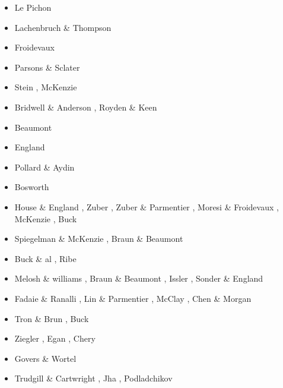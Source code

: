 \begin{scriptsize}
\begin{itemize}
\item[\nineteensixtyeight] Le Pichon \cite{lepi68}
\item[\nineteenseventytwo] Lachenbruch \& Thompson \cite{lath72}
\item[\nineteenseventythree] Froidevaux \cite{froi73}
\item[\nineteenseventyseven] Parsons \& Sclater \cite{pasc77}
\item[\nineteenseventyeight] Stein \cite{stei78}, McKenzie \cite{mcke78}
\item[\nineteeneighty] Bridwell \& Anderson \cite{bran80}, Royden \& Keen \cite{roke80}
\item[\nineteeneightytwo] Beaumont \etal \cite{bekb82}
\item[\nineteeneightythree] England \cite{engl83}
\item[\nineteeneightyfour] Pollard \& Aydin \cite{poay84}
\item[\nineteeneightyfive] Bosworth \cite{bosw85}
\item[\nineteeneightysix] House \& England \cite{hoen86b}, Zuber \etal \cite{zupf86}, 
                          Zuber \& Parmentier \cite{zupa86}, Moresi \& Froidevaux \cite{mofr86},
                          McKenzie \cite{mcke86}, Buck \cite{buck86}
\item[\nineteeneightyseven] Spiegelman \& McKenzie \cite{spmc87}, Braun \& Beaumont \cite{brbe87}
\item[\nineteeneightyeight] Buck \& al \cite{bums88}, Ribe \cite{ribe88b}
\item[\nineteeneightynine] Melosh \& williams \cite{mewi89}, Braun \& Beaumont \cite{brbe89,brbe89b,brbe89c},
                           Issler \etal \cite{ismb89}, Sonder \& England \cite{soen89}
\item[\nineteenninety] Fadaie \& Ranalli \cite{fara90}, Lin \& Parmentier \cite{lipa90},
                       McClay \cite{mccl90}, Chen \& Morgan \cite{chmo90,chmo90b}
\item[\nineteenninetyone] Tron \& Brun \cite{trbr91}, Buck \cite{buck91}
\item[\nineteenninetytwo] Ziegler \cite{zieg92b}, Egan \cite{egan92}, Chery \etal \cite{chld92}
\item[\nineteenninetythree] Govers \& Wortel \cite{gowo93}
\item[\nineteenninetyfour] Trudgill \& Cartwright \cite{trca94}, Jha \etal \cite{jhpp94},
                           Podladchikov \etal \cite{popy94}

\end{itemize}
\end{scriptsize}
